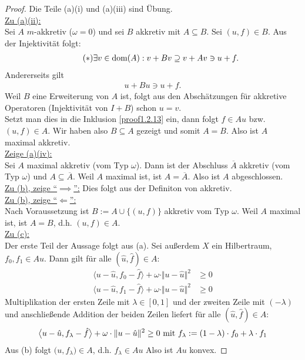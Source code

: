 \begin{proof}
Die Teile (a)(i) und (a)(iii) sind Übung.\\

\underline{Zu (a)(ii):}\\
Sei $A$ $m$-akkretiv ($\omega=0$) und sei $B$ akkretiv mit $A\subseteq B$. Sei $(u,f)\in B$. Aus der Injektivität folgt:
\begin{align}\label{proof1.2.13}\tag{$\ast$}
\exists v\in\dom(A):v+Bv\supseteq v+Av\ni u+f.
\end{align}
Andererseits gilt
\begin{align*}
u+Bu\ni u+f.
\end{align*}
Weil $B$ eine Erweiterung von $A$ ist, folgt aus den Abschätzungen für akkretive Operatoren (Injektivität von $I+B$) schon $u=v$.\\
Setzt man dies in die Inklusion \eqref{proof1.2.13} ein, dann folgt $f\in Au$ bzw. $(u,f)\in A$. Wir haben also $B\subseteq A$ gezeigt und somit $A=B$. Also ist $A$ maximal akkretiv.\\

\underline{Zeige (a)(iv):}\\
Sei $A$ maximal akkretiv (vom Typ $\omega$). Dann ist der Abschluss $\overline{A}$ akkretiv (vom Typ $\omega$) und $A\subseteq\overline{A}$. Weil $A$ maximal ist, ist $A=\overline{A}$. Also ist $A$ abgeschlossen.\\

\underline{Zu (b), zeige ``$\implies$'':}
Dies folgt aus der Definiton von akkretiv.\\

\underline{Zu (b), zeige ``$\Longleftarrow$'':}\\
Nach Voraussetzung ist $B:=A\cup\big\lbrace(u,f)\big\rbrace$ akkretiv vom Typ $\omega$. Weil $A$ maximal ist, ist $A=B$, d.h. $(u,f)\in A$.\\

\underline{Zu (c):}\\
Der erste Teil der Aussage folgt aus (a). Sei außerdem $X$ ein Hilbertraum, $f_0,f_1\in Au$. Dann gilt für alle $(\hat{u},\hat{f})\in A$:
\begin{align*}
\big\langle u-\hat{u},f_0-\hat{f}\big\rangle+\omega\cdot\Vert u-\hat{u}\Vert^2&\geq0\\
\big\langle u-\hat{u},f_1-\hat{f}\big\rangle+\omega\cdot\Vert u-\hat{u}\Vert^2&\geq0
\end{align*}
Multiplikation der ersten Zeile mit $\lambda\in[0,1]$ und der zweiten Zeile mit $(-\lambda)$ und anschließende Addition der beiden Zeilen liefert für alle $(\hat{u},\hat{f})\in A:$
\begin{align*}
\big\langle u-\hat{u},f_\lambda-\hat{f}\big\rangle +\omega\cdot\Vert u-\hat{u}\Vert^2\geq0\mit f_\lambda:=(1-\lambda)\cdot f_0+\lambda\cdot f_1
\end{align*}
Aus (b) folgt $\big(u,f_{\lambda}\big)\in A$, d.h. $f_\lambda\in Au$ Also ist $Au$ konvex.
\end{proof}


